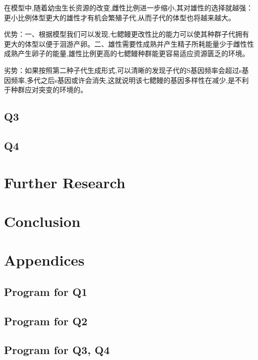 \documentclass[12pt]{article}
\begin{document}
       在模型中,随着幼虫生长资源的改变,雌性比例进一步缩小,其对雄性的选择就越强：更小比例体型更大的雄性才有机会繁殖子代,从而子代的体型也将越来越大。 

        优势：一、根据模型我们可以发现,七鳃鳗更改性比的能力可以使其种群子代拥有更大的体型以便于洄游产卵。二、雄性需要性成熟并产生精子所耗能量少于雌性性成熟产生卵子的能量,雄性比例更高的七鳃鳗种群能更容易适应资源匮乏的环境。 

        劣势：如果按照第二种子代生成形式,可以清晰的发现子代的S基因频率会超过s基因频率,多代之后s基因或许会消失,这就说明该七鳃鳗的基因多样性在减少,是不利于种群应对突变的环境的。 
\subsection{Q3}
\subsection{Q4}
\section{Further Research}

\section{Conclusion}
\newpage
\newpage
\listoffigures
\listoftables


\newpage
\section*{Appendices}
\subsection*{Program for Q1}


\subsection*{Program for Q2}



\subsection*{Program for Q3, Q4}

\end{document}
